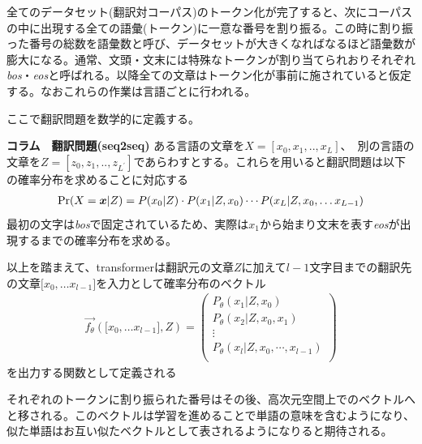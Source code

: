 全てのデータセット(翻訳対コーパス)のトークン化が完了すると、次にコーパスの中に出現する全ての語彙(トークン)に一意な番号を割り振る。この時に割り振った番号の総数を語彙数と呼び、データセットが大きくなればなるほど語彙数が膨大になる。通常、文頭・文末には特殊なトークンが割り当てられおりそれぞれ\emph{bos}・\emph{eos}と呼ばれる。以降全ての文章はトークン化が事前に施されていると仮定する。なおこれらの作業は言語ごとに行われる。

ここで翻訳問題を数学的に定義する。

\begin{itembox}{\bf コラム　翻訳問題(seq2seq)}
  ある言語の文章を$X = [x_0, x_1, .., x_{L}]$、　別の言語の文章を$Z = [z_0, z_1, .., z_{L^\prime}]$であらわすとする。これらを用いると翻訳問題は以下の確率分布を求めることに対応する
  \begin{align}
    \Pr(X = \boldsymbol{x}|Z) = P(x_0| Z) \cdot P(x_1| Z, x_0) \cdots P(x_L| Z, x_0, \ldots x_{L-1})
  \end{align}
  最初の文字は\emph{bos}で固定されているため、実際は$x_1$から始まり文末を表す\emph{eos}が出現するまでの確率分布を求める。

  以上を踏まえて、transformerは翻訳元の文章$Z$に加えて$l-1$文字目までの翻訳先の文章$\lbrack x_0, \ldots x_{l-1} \rbrack$を入力として確率分布のベクトル
  \begin{align}
    \label{eq:trans}
    \vec{f_\theta}(\lbrack x_0, \ldots x_{l-1} \rbrack,Z) = 
    \begin{pmatrix} 
      P_\theta(x_1 | Z, x_0)\\
      P_\theta(x_2 | Z, x_0, x_1)\\ 
      \vdots\\
      P_\theta(x_l | Z, x_0, \cdots, x_{l-1} )\\
      \end{pmatrix}
  \end{align}
  を出力する関数として定義される
\end{itembox}

\vspace{5mm}
それぞれのトークンに割り振られた番号はその後、高次元空間上でのベクトルへと移される。このベクトルは学習を進めることで単語の意味を含むようになり、似た単語はお互い似たベクトルとして表されるようになりると期待される。



